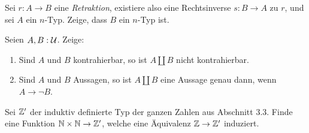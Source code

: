 \documentclass{uebung}
\begin{document}

\begin{exercise}
  Sei $r:A \to B$ eine \emph{Retraktion}, existiere also eine Rechtsinverse $s:B \to A$ zu $r$, und sei $A$ ein $n$-Typ.
  Zeige, dass $B$ ein $n$-Typ ist.
\end{exercise}

\begin{exercise}
  Seien $A,B:\mathcal{U}$.
  Zeige:
  \begin{enumerate}
    \item Sind $A$ und $B$ kontrahierbar, so ist $A \amalg B$ nicht kontrahierbar.
    \item Sind $A$ und $B$ Aussagen, so ist $A \amalg B$ eine Aussage genau dann, wenn $A \to \neg B$.
  \end{enumerate}
\end{exercise}

\begin{exercise}
  Sei $\mathbb{Z}'$ der induktiv definierte Typ der ganzen Zahlen aus Abschnitt 3.3.
  Finde eine Funktion $\mathbb{N}\times \mathbb{N}\to\mathbb{Z}'$, welche eine Äquivalenz $\mathbb{Z}\to\mathbb{Z}'$ induziert.
\end{exercise}
\end{document}

